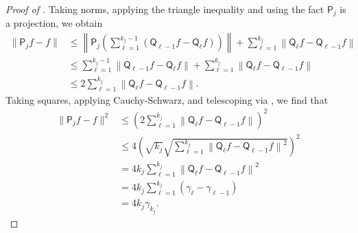 \documentclass[11pt]{article}
\begin{document}
\begin{proof}[Proof of ]
    Taking norms, applying the triangle inequality and using the fact $\mathsf{P}_j$ is a projection, we obtain
\begin{align*}
    \| \mathsf{P}_j f-f\|&\leq \left\| \mathsf{P}_{j}\left(\sum_{\ell=1}^{k_j-1} (\mathsf{Q}_{{\ell-1}} f-\mathsf{Q}_{{\ell}} f)\right)\right\|+\sum_{\ell=1}^{k_j} \left\|\mathsf{Q}_{{\ell}} f -  \mathsf{Q}_{{\ell-1}} f\right\|\\
    &\leq  \sum_{\ell=1}^{k_j-1} \left\|\mathsf{Q}_{{\ell-1}} f-\mathsf{Q}_{{\ell}} f\right\|+\sum_{\ell=1}^{k_j} \left\|\mathsf{Q}_{{\ell}} f -  \mathsf{Q}_{{\ell-1}} f\right\|\\
    &\leq 2 \sum_{\ell=1}^{k_j} \left\|\mathsf{Q}_{{\ell}} f -  \mathsf{Q}_{{\ell-1}} f\right\|.
\end{align*}
Taking squares, applying Cauchy-Schwarz, and telescoping via , we find that
\begin{align*}
    \| \mathsf{P}_j f-f\|^2&\leq \left(2 \sum_{\ell=1}^{k_j} \left\|\mathsf{Q}_{{\ell}} f -  \mathsf{Q}_{{\ell-1}} f\right\|\right)^2\\
    &\leq 4\left(\sqrt{k_j}\sqrt{\sum_{\ell=1}^{k_j} \left\|\mathsf{Q}_{{\ell}} f -  \mathsf{Q}_{{\ell-1}} f\right\|^2}\right)^2\\
    &=4k_j\sum_{\ell=1}^{k_j} \left\|\mathsf{Q}_{{\ell}} f -  \mathsf{Q}_{{\ell-1}} f\right\|^2\\
    &=4k_j\sum_{\ell=1}^{k_j} (\gamma_{\ell}-\gamma_{\ell-1})\\
    &=4k_j\gamma_{k_j}.
\end{align*}


\end{proof}
\end{document}
